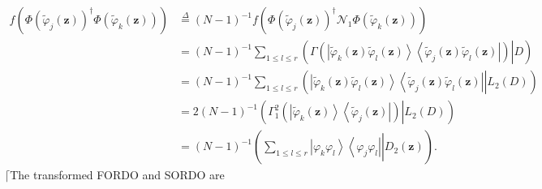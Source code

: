 \documentclass[aps,preprint]{revtex4}%
\begin{document}
\begin{align}
f\left(  \Phi\left(  \tilde{\varphi}_{j}\left(  \mathbf{z}\right)  \right)
^{\dagger}\Phi\left(  \tilde{\varphi}_{k}\left(  \mathbf{z}\right)  \right)
\right)   &  \overset{\Delta}{=}\left(  N-1\right)  ^{-1}f\left(  \Phi\left(
\tilde{\varphi}_{j}\left(  \mathbf{z}\right)  \right)  ^{\dagger}%
\mathcal{N}_{1}\Phi\left(  \tilde{\varphi}_{k}\left(  \mathbf{z}\right)
\right)  \right)  \nonumber\\
&  =\left(  N-1\right)  ^{-1}\sum_{1\leq l\leq r}\left(  \left.  \Gamma\left(
\left\vert \tilde{\varphi}_{k}\left(  \mathbf{z}\right)  \tilde{\varphi}%
_{l}\left(  \mathbf{z}\right)  \right\rangle \left\langle \tilde{\varphi}%
_{j}\left(  \mathbf{z}\right)  \tilde{\varphi}_{l}\left(  \mathbf{z}\right)
\right\vert \right)  \right\vert D\right)  \nonumber\\
&  =\left(  N-1\right)  ^{-1}\sum_{1\leq l\leq r}\left(  \left.  \left\vert
\tilde{\varphi}_{k}\left(  \mathbf{z}\right)  \tilde{\varphi}_{l}\left(
\mathbf{z}\right)  \right\rangle \left\langle \tilde{\varphi}_{j}\left(
\mathbf{z}\right)  \tilde{\varphi}_{l}\left(  \mathbf{z}\right)  \right\vert
\right\vert L_{2}\left(  D\right)  \right)  \nonumber\\
&  =2\left(  N-1\right)  ^{-1}\left(  \left.  \Gamma_{1}^{2}\left(  \left\vert
\tilde{\varphi}_{k}\left(  \mathbf{z}\right)  \right\rangle \left\langle
\tilde{\varphi}_{j}\left(  \mathbf{z}\right)  \right\vert \right)  \right\vert
L_{2}\left(  D\right)  \right)  \nonumber\\
&  =\left(  N-1\right)  ^{-1}\left(  \left.  \sum_{1\leq l\leq r}%
\overset{}{\left\vert \varphi_{k}\varphi_{l}\right\rangle \left\langle
\varphi_{j}\varphi_{l}\right\vert }\right\vert D_{2}\left(  \mathbf{z}\right)
\right)  .
\end{align}
$\lceil$The transformed FORDO and SORDO are
\end{document}
